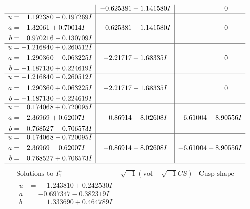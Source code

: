 \documentclass[1p]{elsarticle_modified}
\theoremstyle{definition}
\newcommand{\I}{\sqrt{-1}}
\begin{document}
$$\begin{array}{c|c|c}
 & -0.625381 + 1.141580 I & \phantom{-0.000000 } 0 \\ \hline\begin{aligned}
u &= \phantom{-}1.192380 - 0.197269 I \\
a &= -1.32061 + 0.70014 I \\
b &= \phantom{-}0.970216 - 0.130709 I\end{aligned}
 & -0.625381 - 1.141580 I & \phantom{-0.000000 } 0 \\ \hline\begin{aligned}
u &= -1.216840 + 0.260512 I \\
a &= \phantom{-}1.290360 - 0.063225 I \\
b &= -1.187130 + 0.224619 I\end{aligned}
 & -2.21717 + 1.68335 I & \phantom{-0.000000 } 0 \\ \hline\begin{aligned}
u &= -1.216840 - 0.260512 I \\
a &= \phantom{-}1.290360 + 0.063225 I \\
b &= -1.187130 - 0.224619 I\end{aligned}
 & -2.21717 - 1.68335 I & \phantom{-0.000000 } 0 \\ \hline\begin{aligned}
u &= \phantom{-}0.174068 + 0.720095 I \\
a &= -2.36969 + 0.62007 I \\
b &= \phantom{-}0.768527 - 0.706573 I\end{aligned}
 & -0.86914 + 8.02608 I & -6.61004 - 8.90556 I \\ \hline\begin{aligned}
u &= \phantom{-}0.174068 - 0.720095 I \\
a &= -2.36969 - 0.62007 I \\
b &= \phantom{-}0.768527 + 0.706573 I\end{aligned}
 & -0.86914 - 8.02608 I & -6.61004 + 8.90556 I\\
 \hline 
 \end{array}$$\newpage$$\begin{array}{c|c|c}  
\text{Solutions to }I^u_{1}& \I (\text{vol} + \sqrt{-1}CS) & \text{Cusp shape}\\
 \hline 
\begin{aligned}
u &= \phantom{-}1.243810 + 0.242530 I \\
a &= -0.697347 - 0.382319 I \\
b &= \phantom{-}1.333690 + 0.464789 I\end{aligned}

\end{array}$$
\end{document}
